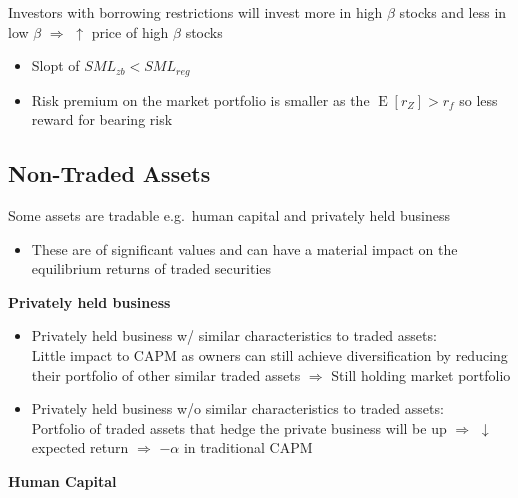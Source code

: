 \documentclass[]{book}
\providecommand{\tightlist}{%
  \setlength{\itemsep}{0pt}\setlength{\parskip}{0pt}}
\theoremstyle{definition}
\theoremstyle{definition}
\theoremstyle{remark}
\begin{document}
Investors with borrowing restrictions will invest more in high \(\beta\)
stocks and less in low \(\beta\) \(\Rightarrow\) \(\uparrow\) price of
high \(\beta\) stocks

\begin{itemize}
\item
  Slopt of \(SML_{zb} < SML_{reg}\)
\item
  Risk premium on the market portfolio is smaller as the
  \(\operatorname{E}[r_Z] > r_f\) so less reward for bearing risk
\end{itemize}

\subsection{Non-Traded Assets}\label{non-traded-assets}

Some assets are tradable e.g.~human capital and privately held business

\begin{itemize}
\tightlist
\item
  These are of significant values and can have a material impact on the
  equilibrium returns of traded securities
\end{itemize}

\textbf{Privately held business}

\begin{itemize}
\item
  Privately held business w/ similar characteristics to traded assets:\\
  Little impact to CAPM as owners can still achieve diversification by
  reducing their portfolio of other similar traded assets
  \(\Rightarrow\) Still holding market portfolio
\item
  Privately held business w/o similar characteristics to traded
  assets:\\
  Portfolio of traded assets that hedge the private business will be up
  \(\Rightarrow\) \(\downarrow\) expected return \(\Rightarrow\)
  \(-\alpha\) in traditional CAPM
\end{itemize}

\textbf{Human Capital}
\end{document}
